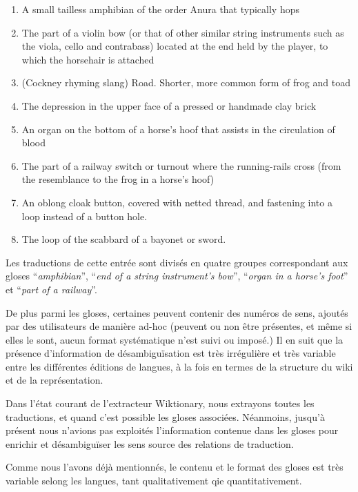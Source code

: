 \documentclass[10pt,a4paper,twoside]{article}
\begin{document}
\begin{small}\begin{enumerate}
\item A small tailless amphibian of the order Anura that typically hops
\item The part of a violin bow (or that of other similar string instruments such as the viola, cello and contrabass) located at the end held by the player, to which the horsehair is attached
\item (Cockney rhyming slang) Road. Shorter, more common form of frog and toad
\item The depression in the upper face of a pressed or handmade clay brick
\item An organ on the bottom of a horse’s hoof that assists in the circulation of blood
\item The part of a railway switch or turnout where the running-rails cross (from the resemblance to the frog in a horse’s hoof)
\item An oblong cloak button, covered with netted thread, and fastening into a loop instead of a button hole.
\item The loop of the scabbard of a bayonet or sword. 
\end{enumerate}\end{small}

Les traductions de cette entrée sont divisés en quatre groupes correspondant aux gloses ``\emph{amphibian}'', ``\emph{end of a string instrument’s bow}'', ``\emph{organ in a horse’s foot}'' et ``\emph{part of a railway}''.

De plus parmi les gloses, certaines peuvent contenir des numéros de sens, ajoutés par des utilisateurs de manière ad-hoc (peuvent ou non être présentes, et même si elles le sont, aucun format systématique n'est suivi ou imposé.) Il en suit que la présence d'information de désambiguïsation est très irrégulière et très variable entre les différentes éditions de langues, à la fois en termes de la structure du wiki et de la représentation. 


Dans l'état courant de l'extracteur Wiktionary, nous extrayons toutes les traductions, et quand c'est possible les gloses associées.  Néanmoins, jusqu'à présent nous n'avions pas exploités l'information contenue dans les gloses pour enrichir et désambiguïser les sens source des relations de traduction.


Comme nous l'avons déjà mentionnés, le contenu et le format des gloses est très variable selong les langues, tant qualitativement qie quantitativement.
\end{document}
